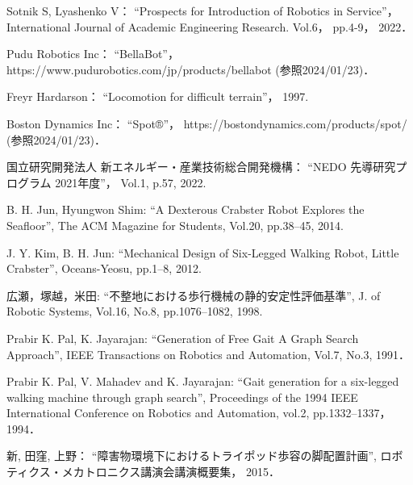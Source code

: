 ﻿

\begin{thebibliography}{99}
    Sotnik S, Lyashenko V：
    ``Prospects for Introduction of Robotics in Service''，
    International Journal of Academic Engineering Research.
    Vol.6，
    pp.4-9， %
    2022．

    Pudu Robotics Inc：
    ``BellaBot''，
    https://www.pudurobotics.com/jp/products/bellabot (参照2024/01/23)．

    Freyr Hardarson：
    ``Locomotion for difficult terrain''，
    1997.

    Boston Dynamics Inc：
    ``Spot®''，
    https://bostondynamics.com/products/spot/ (参照2024/01/23)．

    国立研究開発法人 新エネルギー・産業技術総合開発機構：
    ``NEDO 先導研究プログラム 2021年度''，
    Vol.1,
    p.57, 
    2022. 

    B. H. Jun, Hyungwon Shim:
    ``A Dexterous Crabster Robot Explores the Seafloor'',
    The ACM Magazine for Students,
    Vol.20,
    pp.38--45,
    2014.

    J. Y. Kim, B. H. Jun:
    ``Mechanical Design of Six-Legged Walking Robot, Little Crabster'',
    Oceans-Yeosu,
    pp.1--8,
    2012.

    広瀬，塚越，米田: 
    ``不整地における歩行機械の静的安定性評価基準'', 
    J. of Robotic Systems,
    Vol.16, No.8, 
    pp.1076--1082,
    1998.

    Prabir K. Pal, K. Jayarajan: 
    ``Generation of Free Gait A Graph Search Approach'',
    IEEE Transactions on Robotics and Automation,
    Vol.7, No.3,
    1991．

    Prabir K. Pal, V. Mahadev and K. Jayarajan:
    ``Gait generation for a six-legged walking machine through graph search'',
    Proceedings of the 1994 IEEE International Conference on Robotics and Automation,
    vol.2,
    pp.1332--1337，
    1994．

    新, 田窪, 上野：
    ``障害物環境下におけるトライポッド歩容の脚配置計画'',
    ロボティクス・メカトロニクス講演会講演概要集，
    2015．


\end{thebibliography}
